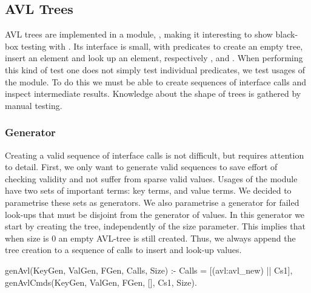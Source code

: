 

\subsection{AVL Trees}
AVL trees are implemented in a \Yap{} module,  , making it interesting to
show black-box testing with \plqc{}.
%
Its interface is small, with predicates%
to create an empty
tree, insert an element and look up an element, respectively
,  and .
%
%
When performing this kind of test one does not simply test individual
predicates, we test usages of the module.
%
To do this we must be able to create sequences of interface
calls and inspect intermediate results.
%
Knowledge about the shape of trees is gathered by manual testing.

\subsubsection*{Generator}


Creating a valid sequence of interface calls is not difficult, but
requires attention to detail.
%
First, we only want to generate valid sequences
%
to save effort of checking validity and not suffer
from sparse valid values.
%
Usages of the module have two sets of important terms: key
terms, and value terms.
%
We decided to parametrise these sets as generators.
%
We also parametrise a
generator for failed look-ups that must be disjoint from the generator
of values.
%
In this generator we start by creating the tree, independently of the
size parameter.
%
This implies that when size is 0 an empty AVL-tree is still created.
%
Thus, we always append the tree creation to a sequence of calls to insert and look-up
values.
%
\begin{yapcode}
 genAvl(KeyGen, ValGen, FGen, Calls, Size) :-
   Calls = [(avl:avl_new) || Cs1],
   genAvlCmds(KeyGen, ValGen, FGen,
              [], Cs1, Size).
\end{yapcode}


